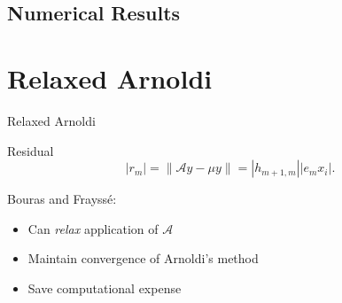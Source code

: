\documentclass[xcolor={usenames, dvipsnames},]{beamer}
\newcommand{\A}{\ensuremath{\mathcal{A}}}
\begin{document}
\subsection{Numerical Results}

\section{Relaxed Arnoldi}
\begin{frame}{Relaxed Arnoldi}
    \begin{block}{Residual}
        \begin{equation*}
            \left|r_m\right| = \left\|\A y - \mu y\right\| = \left|h_{m+1,m}\right|\left|e_mx_i\right|.
        \end{equation*}
    \end{block}
    \pause
    \vspace{1em}
    Bouras and Frayss\'e:
    \begin{itemize}
        \item Can \emph{relax} application of \A{}
        \item Maintain convergence of Arnoldi's method
        \item Save computational expense
    \end{itemize}
\end{frame}
\end{document}
